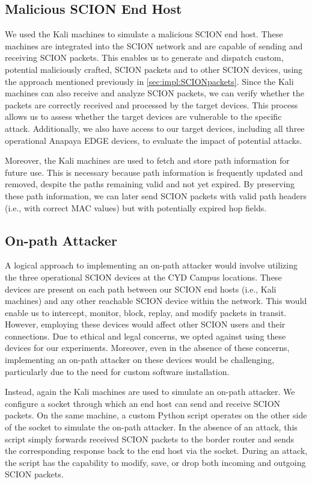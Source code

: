 \subsection{Malicious SCION End Host}
We used the Kali machines to simulate a malicious SCION end host.
These machines are integrated into the SCION network and are capable of sending and receiving SCION packets.
This enables us to generate and dispatch custom, potential maliciously crafted, SCION packets and to other SCION devices, using the approach mentioned previously in \cref{sec:impl:SCIONpackets}.
Since the Kali machines can also receive and analyze SCION packets, we can verify whether the packets are correctly received and processed by the target devices.
This process allows us to assess whether the target devices are vulnerable to the specific attack.
Additionally, we also have access to our target devices, including all three operational Anapaya EDGE devices, to evaluate the impact of potential attacks.

Moreover, the Kali machines are used to fetch and store path information for future use.
This is necessary because path information is frequently updated and removed, despite the paths remaining valid and not yet expired.
By preserving these path information, we can later send SCION packets with valid path headers (i.e., with correct MAC values) but with potentially expired hop fields.

\newpage
\subsection{On-path Attacker}
A logical approach to implementing an on-path attacker would involve utilizing the three operational SCION devices at the CYD Campus locations.
These devices are present on each path between our SCION end hosts (i.e., Kali machines) and any other reachable SCION device within the network.
This would enable us to intercept, monitor, block, replay, and modify packets in transit.
However, employing these devices would affect other SCION users and their connections.
Due to ethical and legal concerns, we opted against using these devices for our experiments.
Moreover, even in the absence of these concerns, implementing an on-path attacker on these devices would be challenging, particularly due to the need for custom software installation.

Instead, again the Kali machines are used to simulate an on-path attacker.
We configure a socket through which an end host can send and receive SCION packets.
On the same machine, a custom Python script operates on the other side of the socket to simulate the on-path attacker.
In the absence of an attack, this script simply forwards received SCION packets to the border router and sends the corresponding response back to the end host via the socket.
During an attack, the script has the capability to modify, save, or drop both incoming and outgoing SCION packets.



